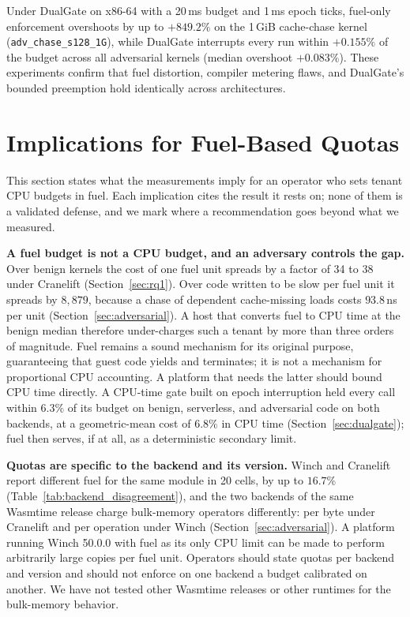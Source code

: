 \documentclass{ws-jcsc}
\begin{document}
Under DualGate on x86-64 with a 20\,ms budget and 1\,ms epoch ticks, fuel-only enforcement overshoots by up to $+849.2\%$ on the 1\,GiB cache-chase kernel (\texttt{adv\_chase\_s128\_1G}), while DualGate interrupts every run within $+0.155\%$ of the budget across all adversarial kernels (median overshoot $+0.083\%$). These experiments confirm that fuel distortion, compiler metering flaws, and DualGate's bounded preemption hold identically across architectures.

\section{Implications for Fuel-Based Quotas}
\label{sec:discussion}
This section states what the measurements imply for an operator who sets tenant CPU budgets in fuel. Each implication cites the result it rests on; none of them is a validated defense, and we mark where a recommendation goes beyond what we measured.

\textbf{A fuel budget is not a CPU budget, and an adversary controls the gap.} Over benign kernels the cost of one fuel unit spreads by a factor of 34 to 38 under Cranelift (Section~\ref{sec:rq1}). Over code written to be slow per fuel unit it spreads by $8{,}879$, because a chase of dependent cache-missing loads costs $93.8$\,ns per unit (Section~\ref{sec:adversarial}). A host that converts fuel to CPU time at the benign median therefore under-charges such a tenant by more than three orders of magnitude. Fuel remains a sound mechanism for its original purpose, guaranteeing that guest code yields and terminates; it is not a mechanism for proportional CPU accounting. A platform that needs the latter should bound CPU time directly. A CPU-time gate built on epoch interruption held every call within $6.3\%$ of its budget on benign, serverless, and adversarial code on both backends, at a geometric-mean cost of $6.8\%$ in CPU time (Section~\ref{sec:dualgate}); fuel then serves, if at all, as a deterministic secondary limit.

\textbf{Quotas are specific to the backend and its version.} Winch and Cranelift report different fuel for the same module in 20 cells, by up to $16.7\%$ (Table~\ref{tab:backend_disagreement}), and the two backends of the same Wasmtime release charge bulk-memory operators differently: per byte under Cranelift and per operation under Winch (Section~\ref{sec:adversarial}). A platform running Winch 50.0.0 with fuel as its only CPU limit can be made to perform arbitrarily large copies per fuel unit. Operators should state quotas per backend and version and should not enforce on one backend a budget calibrated on another. We have not tested other Wasmtime releases or other runtimes for the bulk-memory behavior.
\end{document}
